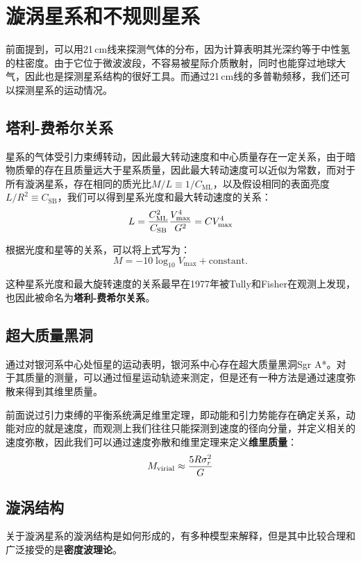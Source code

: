 \documentclass[openany]{ctexbook}
\begin{document}
\section{漩涡星系和不规则星系}
前面提到，可以用21\,cm线来探测气体的分布，因为计算表明其光深约等于中性氢的柱密度。由于它位于微波波段，不容易被星际介质散射，同时也能穿过地球大气，因此也是探测星系结构的很好工具。而通过21\,cm线的多普勒频移，我们还可以探测星系的运动情况。

\subsection{塔利-费希尔关系}
星系的气体受引力束缚转动，因此最大转动速度和中心质量存在一定关系，由于暗物质晕的存在且质量远大于星系质量，因此最大转动速度可以近似为常数，而对于所有漩涡星系，存在相同的质光比$M/L\equiv 1/C_\mathrm{ML}$，以及假设相同的表面亮度$L/R^2\equiv C_\mathrm{SB}$，我们可以得到星系光度和最大转动速度的关系：
\begin{equation}
  L={C_\mathrm{ML}^2\over C_\mathrm{SB}}{V_\mathrm{max}^4\over G^2}=CV_\mathrm{max}^4
\end{equation}

根据光度和星等的关系，可以将上式写为：
\begin{equation}
  M=-10\log_{10}V_\mathrm{max}+\mathrm{constant.}
\end{equation}

这种星系光度和最大旋转速度的关系最早在1977年被Tully和Fisher在观测上发现，也因此被命名为\textbf{塔利-费希尔关系}。

\subsection{超大质量黑洞}
通过对银河系中心处恒星的运动表明，银河系中心存在超大质量黑洞Sgr A*。对于其质量的测量，可以通过恒星运动轨迹来测定，但是还有一种方法是通过速度弥散来得到其维里质量。

前面说过引力束缚的平衡系统满足维里定理，即动能和引力势能存在确定关系，动能对应的就是速度，而观测上我们往往只能探测到速度的径向分量，并定义相关的速度弥散，因此我们可以通过速度弥散和维里定理来定义\textbf{维里质量}：
\begin{equation}
  M_\mathrm{virial}\approx{5R\sigma_r^2\over G}
\end{equation}

\subsection{漩涡结构}
关于漩涡星系的漩涡结构是如何形成的，有多种模型来解释，但是其中比较合理和广泛接受的是\textbf{密度波理论}。
\end{document}
